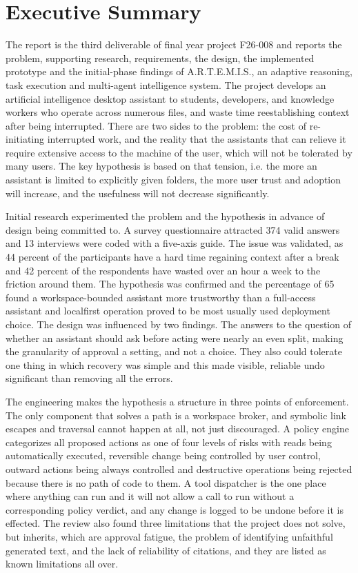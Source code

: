 \documentclass{FastFyp}
\begin{document}
\section*{Executive Summary}
The report is the third deliverable of final year project F26-008 and reports the problem, supporting research, requirements, the design, the implemented prototype and the initial-phase findings of A.R.T.E.M.I.S., an adaptive reasoning, task execution and multi-agent intelligence system. The project develops an artificial intelligence desktop assistant to students, developers, and knowledge workers who operate across numerous files, and waste time reestablishing context after being interrupted. There are two sides to the problem: the cost of re-initiating interrupted work, and the reality that the assistants that can relieve it require extensive access to the machine of the user, which will not be tolerated by many users. The key hypothesis is based on that tension, i.e. the more an assistant is limited to explicitly given folders, the more user trust and adoption will increase, and the usefulness will not decrease significantly.

Initial research experimented the problem and the hypothesis in advance of design being committed to. A survey questionnaire attracted 374 valid answers and 13 interviews were coded with a five-axis guide. The issue was validated, as 44 percent of the participants have a hard time regaining context after a break and 42 percent of the respondents have wasted over an hour a week to the friction around them. The hypothesis was confirmed and the percentage of 65 found a workspace-bounded assistant more trustworthy than a full-access assistant and localfirst operation proved to be most usually used deployment choice. The design was influenced by two findings. The answers to the question of whether an assistant should ask before acting were nearly an even split, making the granularity of approval a setting, and not a choice. They also could tolerate one thing in which recovery was simple and this made visible, reliable undo significant than removing all the errors.

The engineering makes the hypothesis a structure in three points of enforcement. The only component that solves a path is a workspace broker, and symbolic link escapes and traversal cannot happen at all, not just discouraged. A policy engine categorizes all proposed actions as one of four levels of risks with reads being automatically executed, reversible change being controlled by user control, outward actions being always controlled and destructive operations being rejected because there is no path of code to them. A tool dispatcher is the one place where anything can run and it will not allow a call to run without a corresponding policy verdict, and any change is logged to be undone before it is effected. The review also found three limitations that the project does not solve, but inherits, which are approval fatigue, the problem of identifying unfaithful generated text, and the lack of reliability of citations, and they are listed as known limitations all over.
\end{document}

